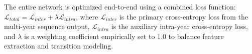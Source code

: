 The entire network is optimized end-to-end using a combined loss function:
$\mathcal{L}_{total} = \mathcal{L}_{inter} + \lambda \mathcal{L}_{intra}$, where $\mathcal{L}_{inter}$ is
the primary cross-entropy loss from the multi-year sequence output, $\mathcal{L}_{intra}$ is the
auxiliary intra-year cross-entropy loss, and $\lambda$ is a weighting coefficient empirically
set to $1.0$ to balance feature extraction and transition modeling.